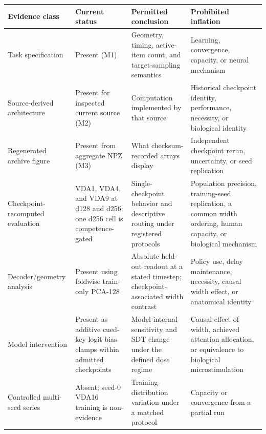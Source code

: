 \documentclass[11pt,a4paper]{article}
\begin{document}
\begingroup\small
\begin{tabularx}{\textwidth}{@{}p{3.5cm}p{2.7cm}Y Y@{}}
\toprule
\textbf{Evidence class} & \textbf{Current status} & \textbf{Permitted conclusion} & \textbf{Prohibited inflation}\\
\midrule
Task specification & Present (M1) & Geometry, timing, active-item count, and target-sampling semantics & Learning, convergence, capacity, or neural mechanism\\
Source-derived architecture & Present for inspected current source (M2) & Computation implemented by that source & Historical checkpoint identity, performance, necessity, or biological identity\\
Regenerated archive figure & Present from aggregate NPZ (M3) & What checksum-recorded arrays display & Independent checkpoint rerun, uncertainty, or seed replication\\
Checkpoint-recomputed evaluation & VDA1, VDA4, and VDA9 at d128 and d256; one d256 cell is competence-gated & Single-checkpoint behavior and descriptive routing under registered protocols & Population precision, training-seed replication, a common width ordering, human capacity, or biological mechanism\\
Decoder/geometry analysis & Present using foldwise train-only PCA-128 & Absolute held-out readout at a stated timestep; checkpoint-associated width contrast & Policy use, delay maintenance, necessity, causal width effect, or anatomical identity\\
Model intervention & Present as additive cued-key logit-bias clamps within admitted checkpoints & Model-internal sensitivity and SDT change under the defined dose regime & Causal effect of width, achieved attention allocation, or equivalence to biological microstimulation\\
Controlled multi-seed series & Absent; seed-0 VDA16 training is non-evidence & Training-distribution variation under a matched protocol & Capacity or convergence from a partial run\\
\bottomrule
\end{tabularx}
\endgroup

\tableofcontents
\clearpage
\end{document}
